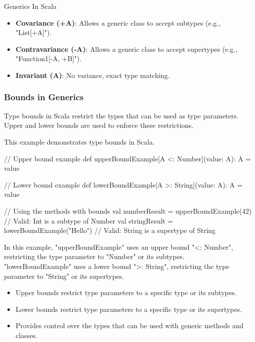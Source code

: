 \begin{notes}{Generics In Scala}
\begin{highlight}
        \begin{itemize}
            \item \textbf{Covariance (+A)}: Allows a generic class to accept subtypes (e.g., "List[+A]").
            \item \textbf{Contravariance (-A)}: Allows a generic class to accept supertypes (e.g., "Function1[-A, +B]").
            \item \textbf{Invariant (A)}: No variance, exact type matching.
        \end{itemize}
    
    \end{highlight}
    
    \subsubsection*{Bounds in Generics}
    
    Type bounds in Scala restrict the types that can be used as type parameters. Upper and lower bounds are used to enforce these restrictions.
    
    \begin{highlight}
    
        This example demonstrates type bounds in Scala.
    
    \begin{code}[Scala]
    // Upper bound example
    def upperBoundExample[A <: Number](value: A): A = value
    
    // Lower bound example
    def lowerBoundExample[A >: String](value: A): A = value
    
    // Using the methods with bounds
    val numberResult = upperBoundExample(42)  // Valid: Int is a subtype of Number
    val stringResult = lowerBoundExample("Hello")  // Valid: String is a supertype of String
    \end{code}
    
        In this example, "upperBoundExample" uses an upper bound "<: Number", restricting the type parameter to "Number" or its subtypes. "lowerBoundExample" uses a lower bound ">: String", restricting 
        the type parameter to "String" or its supertypes.
    
        \begin{itemize}
            \item Upper bounds restrict type parameters to a specific type or its subtypes.
            \item Lower bounds restrict type parameters to a specific type or its supertypes.
            \item Provides control over the types that can be used with generic methods and classes.
        \end{itemize}
    

\end{highlight}
\end{notes}
